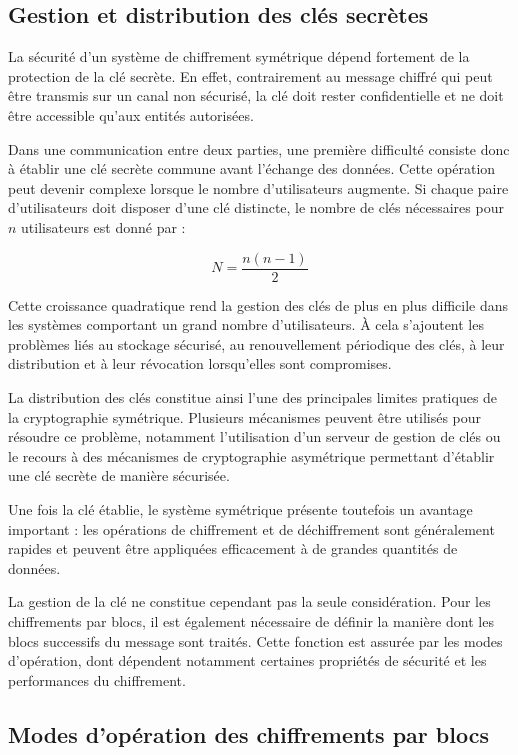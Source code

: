 \documentclass[12pt,a4paper]{article}
\begin{document}
\subsection{Gestion et distribution des clés secrètes}

La sécurité d'un système de chiffrement symétrique dépend fortement de la protection de la clé secrète. En effet, contrairement au message chiffré qui peut être transmis sur un canal non sécurisé, la clé doit rester confidentielle et ne doit être accessible qu'aux entités autorisées.

Dans une communication entre deux parties, une première difficulté consiste donc à établir une clé secrète commune avant l'échange des données. Cette opération peut devenir complexe lorsque le nombre d'utilisateurs augmente. Si chaque paire d'utilisateurs doit disposer d'une clé distincte, le nombre de clés nécessaires pour $n$ utilisateurs est donné par :

\begin{equation}
N = \frac{n(n-1)}{2}
\end{equation}

Cette croissance quadratique rend la gestion des clés de plus en plus difficile dans les systèmes comportant un grand nombre d'utilisateurs. À cela s'ajoutent les problèmes liés au stockage sécurisé, au renouvellement périodique des clés, à leur distribution et à leur révocation lorsqu'elles sont compromises.

La distribution des clés constitue ainsi l'une des principales limites pratiques de la cryptographie symétrique. Plusieurs mécanismes peuvent être utilisés pour résoudre ce problème, notamment l'utilisation d'un serveur de gestion de clés ou le recours à des mécanismes de cryptographie asymétrique permettant d'établir une clé secrète de manière sécurisée.

Une fois la clé établie, le système symétrique présente toutefois un avantage important : les opérations de chiffrement et de déchiffrement sont généralement rapides et peuvent être appliquées efficacement à de grandes quantités de données.

La gestion de la clé ne constitue cependant pas la seule considération. Pour les chiffrements par blocs, il est également nécessaire de définir la manière dont les blocs successifs du message sont traités. Cette fonction est assurée par les modes d'opération, dont dépendent notamment certaines propriétés de sécurité et les performances du chiffrement.

\subsection{Modes d'opération des chiffrements par blocs}
\end{document}
